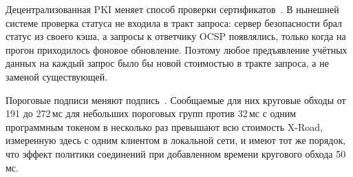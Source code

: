 \documentclass[conference,a4paper]{IEEEtran}
\begin{document}
Децентрализованная PKI меняет способ проверки сертификатов~\cite{bakhtina2023ares}. В нынешней
системе проверка статуса не входила в тракт запроса: сервер безопасности брал статус из
своего кэша, а запросы к ответчику OCSP появлялись, только когда на прогон приходилось фоновое
обновление. Поэтому любое предъявление
учётных данных на каждый запрос было бы новой стоимостью в тракте запроса, а не
заменой существующей.

Пороговые подписи меняют подпись~\cite{bakhtina2026ijis}. Сообщаемые для них круговые обходы от 191 до
272\,мс для небольших пороговых групп против 32\,мс с одним программным токеном в несколько раз превышают
всю стоимость X-Road, измеренную здесь с одним клиентом в локальной сети, и имеют тот же порядок, что
эффект политики соединений при добавленном времени кругового обхода 50\,мс.
\end{document}
